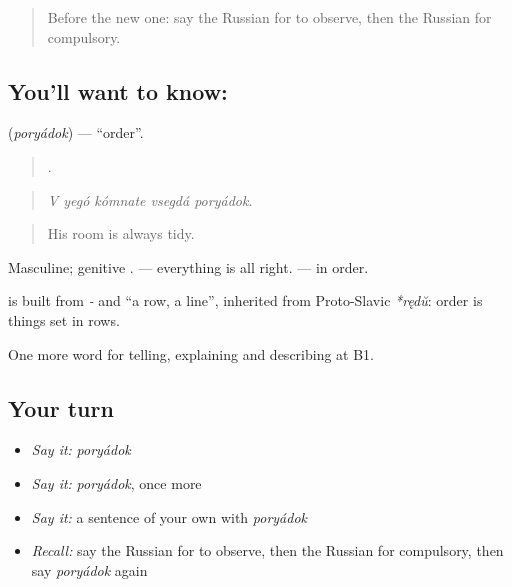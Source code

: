 \label{lesson:RU-C390-poryadok}



\begin{quote}
Before the new one: say the Russian for to observe, then the Russian for compulsory.
\end{quote}

\subsection*{You'll want to know: }
\textbf{} (\emph{poryádok}) — \textquotedblleft{}order\textquotedblright{}.

\begin{quote}
    .
\end{quote}

\begin{quote}
\emph{V yegó kómnate vsegdá poryádok.}
\end{quote}

\begin{quote}
His room is always tidy.
\end{quote}

Masculine; genitive \emph{}. \emph{  } — everything is all right. \emph{ } — in order.

\begin{cousinweb}
\textbf{} is built from \emph{-} and \emph{} \textquotedblleft{}a row, a line\textquotedblright{}, inherited from Proto-Slavic \emph{*rędŭ}: order is things set in rows.
\end{cousinweb}

\begin{grammarlens}[title={What you've built}]
One more word for telling, explaining and describing at B1.
\end{grammarlens}

\subsection*{Your turn}
\begin{itemize}
\raggedright
  \item \emph{Say it:} \emph{poryádok}
  \item \emph{Say it:} \emph{poryádok}, once more
  \item \emph{Say it:} a sentence of your own with \emph{poryádok}
  \item \emph{Recall:} say the Russian for to observe, then the Russian for compulsory, then say \emph{poryádok} again
\end{itemize}

